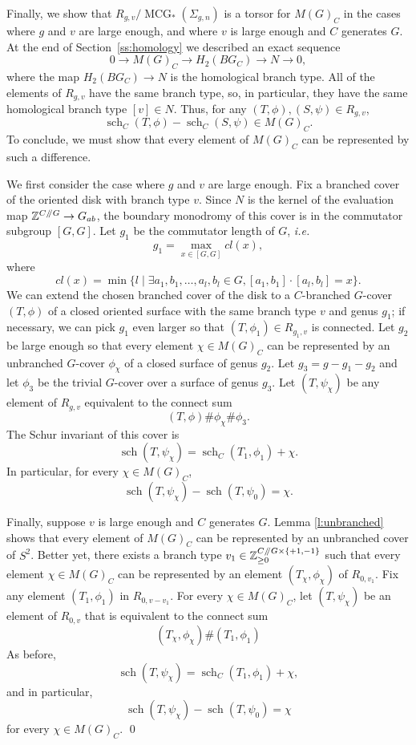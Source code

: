 \documentclass[10pt,twocolumn,amsmath,amssymb,aps,pra,secnumarabic,
    nofootinbib,groupedaddress]{revtex4-1}
\newcommand{\Sec}[1]{Section~\ref{#1}}
\newcommand{\ie}{\emph{i.e.~}}
\newcommand{\sslash}{\mathbin{/\mkern-5mu/}}
\newcommand{\MCG}{\operatorname{MCG}}
\newcommand{\sch}{\operatorname{sch}}
\begin{document}
Finally, we show that $R_{g,v}/\MCG_*(\Sigma_{g,n})$ is a torsor for $M(G)_C$ in the cases where $g$ and $v$ are large enough, and where $v$ is large enough and $C$ generates $G$.  At the end of \Sec{ss:homology} we described an exact sequence
\[ 0 \to M(G)_C \to H_2(BG_C) \to N \to 0, \]
where the map $H_2(BG_C) \to N$ is the homological branch type.  All of the elements of $R_{g,v}$ have the same branch type, so, in particular, they have the same homological branch type $[v] \in N$.  Thus, for any $(T,\phi), (S,\psi) \in R_{g,v}$,
\[ \sch_C(T,\phi) - \sch_C(S,\psi) \in M(G)_C.\]
To conclude, we must show that every element of $M(G)_C$ can be represented by such a difference.

We first consider the case where $g$ and $v$ are large enough.  Fix a branched cover of the oriented disk with branch type $v$.  Since $N$ is the kernel of the evaluation map $\mathbb{Z}^{C \sslash G} \to G_{ab}$, the boundary monodromy of this cover is in the commutator subgroup $[G,G]$.  Let $g_1$ be the commutator length of $G$, \ie
\[ g_1 = \max_{x\in [G,G]} cl(x), \]
where
\[ cl(x) = \min \{ l \mid \exists a_1,b_1,\dots,a_l,b_l \in G, [a_1,b_1]\cdot [a_l,b_l] = x \}. \]
We can extend the chosen branched cover of the disk to a $C$-branched $G$-cover $(T,\phi)$ of a closed oriented surface with the same branch type $v$ and genus $g_1$; if necessary, we can pick $g_1$ even larger so that $(T,\phi_1) \in R_{g_1,v}$ is connected.  Let $g_2$ be large enough so that every element $\chi \in M(G)_C$ can be represented by an unbranched $G$-cover $\phi_\chi$ of a closed surface of genus $g_2$.  Let $g_3=g-g_1-g_2$ and let $\phi_3$ be the trivial $G$-cover over a surface of genus $g_3$.  Let $(T,\psi_\chi)$ be any element of $R_{g,v}$ equivalent to the connect sum
\[ (T,\phi) \# \phi_\chi \# \phi_3. \]
The Schur invariant of this cover is
\[\sch(T,\psi_\chi) = \sch_C(T_1,\phi_1) + \chi. \]
In particular, for every $\chi \in M(G)_C$,
\[ \sch(T,\psi_\chi) -\sch(T,\psi_0) = \chi. \]

Finally, suppose $v$ is large enough and $C$ generates $G$.  Lemma \ref{l:unbranched} shows that every element of $M(G)_C$ can be represented by an unbranched cover of $S^2$.  Better yet, there exists a branch type $v_1 \in \mathbb{Z}_{\ge 0}^{C\sslash G \times \{+1,-1\}}$ such that every element $\chi \in M(G)_C$ can be represented by an element $(T_\chi, \phi_\chi)$ of $R_{0,v_1}$.  Fix any element $(T_1,\phi_1)$ in $R_{0,v-v_1}$.  For every $\chi \in M(G)_C$, let $(T,\psi_\chi)$ be an element of $R_{0,v}$ that is equivalent to the connect sum
\[ (T_\chi, \phi_\chi) \# (T_1,\phi_1) \]
As before,
\[\sch(T,\psi_\chi) = \sch_C(T_1,\phi_1) + \chi, \]
and in particular,
\[ \sch(T,\psi_\chi) -\sch(T,\psi_0) = \chi \]
for every $\chi \in M(G)_C$.
\qed
\end{document}
